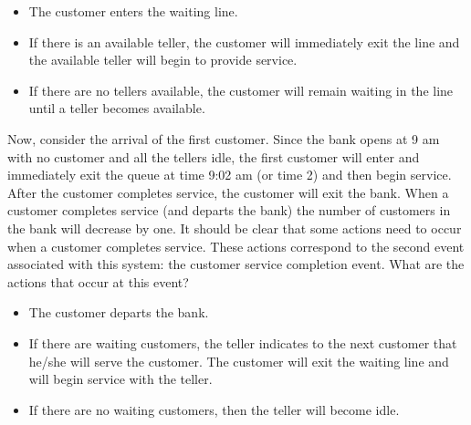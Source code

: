 \documentclass[
]{book}
\theoremstyle{definition}
\theoremstyle{definition}
\theoremstyle{definition}
\theoremstyle{definition}
\theoremstyle{remark}
\begin{document}
\begin{itemize}
\item
  The customer enters the waiting line.
\item
  If there is an available teller, the customer will immediately exit
  the line and the available teller will begin to provide service.
\item
  If there are no tellers available, the customer will remain waiting
  in the line until a teller becomes available.
\end{itemize}

Now, consider the arrival of the first customer. Since the bank opens at
9 am with no customer and all the tellers idle, the first customer will
enter and immediately exit the queue at time 9:02 am (or time 2) and
then begin service. After the customer completes service, the customer
will exit the bank. When a customer completes service (and departs the
bank) the number of customers in the bank will decrease by one. It
should be clear that some actions need to occur when a customer
completes service. These actions correspond to the second event
associated with this system: the customer service completion event. What
are the actions that occur at this event?

\begin{itemize}
\item
  The customer departs the bank.
\item
  If there are waiting customers, the teller indicates to the next
  customer that he/she will serve the customer. The customer will exit
  the waiting line and will begin service with the teller.
\item
  If there are no waiting customers, then the teller will become idle.
\end{itemize}
\end{document}

